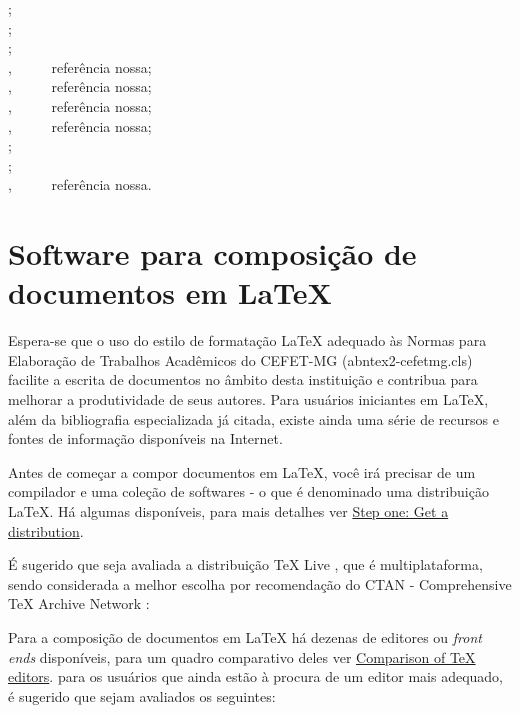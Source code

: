 \begin{apendicesenv}
{    \cite{sony1990} ;\\
    \cite{brasil1966} ;\\
    \cite{souza1985} ;\\
    \cite{TeX-Br2014} , \ \ \ \ \ referência nossa;\\
    \cite{TeXLive2014} , \ \ \ \ \ referência nossa;\\
    \cite{TeXnicCenter2014} , \ \ \ \ \ referência nossa;\\
    \cite{TeXstudio2014} , \ \ \ \ \ referência nossa;\\
    \cite{vaso1999} ;\\
    \cite{villa1916} ;\\
    \cite{Wikibooks2014} , \ \ \ \ \ referência nossa.\\
}



\chapter{Software para composição de documentos em \LaTeX}
\label{chap:softApoio}

Espera-se que o uso do estilo de formatação \LaTeX{} adequado às Normas para Elaboração de Trabalhos Acadêmicos do CEFET-MG ({\ttfamily abntex2-cefetmg.cls}) facilite a escrita de documentos no âmbito desta instituição e contribua para melhorar a produtividade de seus autores. Para usuários iniciantes em \LaTeX{}, além da bibliografia especializada já citada, existe ainda uma série de recursos \cite{CTAN2014} e fontes de informação \cite{TeX-Br2014,Wikibooks2014} disponíveis na Internet.

Antes de começar a compor documentos em \LaTeX{}, você irá precisar de um compilador e uma coleção de softwares - o que é denominado uma distribuição \LaTeX{}. Há algumas disponíveis, para mais detalhes ver \href{http://www.ctan.org/starter.html}{Step one: Get a distribution}.

É sugerido que seja avaliada a distribuição TeX Live \cite{TeXLive2014}, que é multiplataforma, sendo considerada a melhor escolha por recomendação do CTAN - Comprehensive \TeX{} Archive Network \cite{CTAN2014}:

Para a composição de documentos em \LaTeX{} há dezenas de editores ou \textit{front ends} disponíveis, para um quadro comparativo deles ver \href{http://en.wikipedia.org/wiki/Comparison_of_TeX_editors}{Comparison of TeX editors}. para os usuários que ainda estão à procura de um editor mais adequado, é sugerido que sejam avaliados os seguintes:


\end{apendicesenv}
